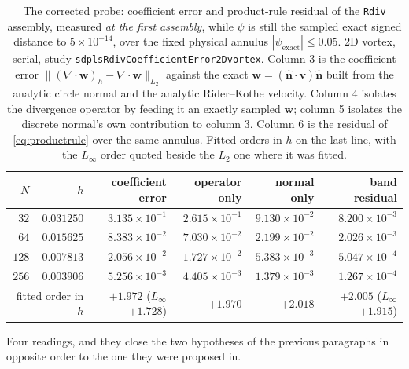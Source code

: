 \documentclass[preprint,3p,11pt]{elsarticle}
\newcommand{\psilev}{\psi}
\newcommand{\nhat}{\hat{\mathbf{n}}}
\begin{document}
\begin{table}[htbp]
  \centering
  \caption{The corrected probe: coefficient error and product-rule residual of the
  \texttt{Rdiv} assembly, measured \emph{at the first assembly}, while $\psilev$ is
  still the sampled exact signed distance to $5\times10^{-14}$, over the fixed
  physical annulus $|\psilev_{\text{exact}}| \le 0.05$. 2D vortex, serial, study
  \texttt{sdplsRdivCoefficientError2Dvortex}. Column 3 is the coefficient error
  $\|(\nabla\cdot\mathbf{w})_h - \nabla\cdot\mathbf{w}\|_{L_2}$ against the exact
  $\mathbf{w} = (\nhat\cdot\mathbf{v})\nhat$ built from the analytic circle normal
  and the analytic Rider--Kothe velocity. Column 4 isolates the divergence operator
  by feeding it an exactly sampled $\mathbf{w}$; column 5 isolates the discrete
  normal's own contribution to column 3. Column 6 is the residual of
  \eqref{eq:productrule} over the same annulus. Fitted orders in $h$ on the last
  line, with the $L_\infty$ order quoted beside the $L_2$ one where it was fitted.}
  \label{tab:rdiv-coefficient}
  \small
  \begin{tabular}{rrrrrr}
    \toprule
    $N$ & $h$ & coefficient error & operator only & normal only & band residual \\
    \midrule
    $32$  & $0.031250$ & $3.135\times10^{-1}$ & $2.615\times10^{-1}$ & $9.130\times10^{-2}$ & $8.200\times10^{-3}$ \\
    $64$  & $0.015625$ & $8.383\times10^{-2}$ & $7.030\times10^{-2}$ & $2.199\times10^{-2}$ & $2.026\times10^{-3}$ \\
    $128$ & $0.007813$ & $2.056\times10^{-2}$ & $1.727\times10^{-2}$ & $5.383\times10^{-3}$ & $5.047\times10^{-4}$ \\
    $256$ & $0.003906$ & $5.256\times10^{-3}$ & $4.405\times10^{-3}$ & $1.379\times10^{-3}$ & $1.267\times10^{-4}$ \\
    \midrule
    \multicolumn{2}{r}{fitted order in $h$}
      & $+1.972$ ($L_\infty$ $+1.728$)
      & $+1.970$
      & $+2.018$
      & $+2.005$ ($L_\infty$ $+1.915$) \\
    \bottomrule
  \end{tabular}
\end{table}

Four readings, and they close the two hypotheses of the previous paragraphs in
opposite order to the one they were proposed in.
\end{document}
